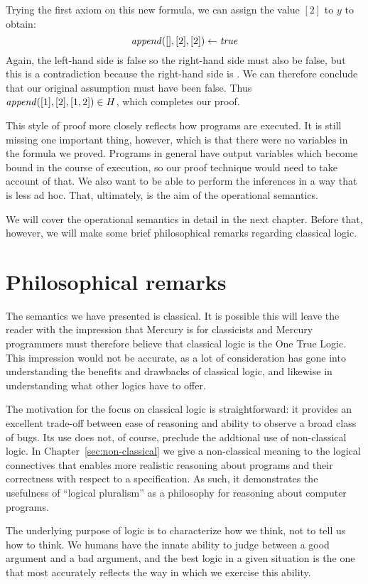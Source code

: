 Trying the first axiom on this new formula,
we can assign the value $[2]$ to $y$ to obtain:
\[
    \text{\textit{append}}([], [2], [2]) \leftarrow \text{\textit{true}}
\]
Again,
the left-hand side is false
so the right-hand side must also be false,
but this is a contradiction
because the right-hand side is .
We can therefore conclude that
our original assumption must have been false.
Thus $\text{\textit{append}}([1], [2], [1, 2]) \in H$,
which completes our proof.

This style of proof more closely reflects how programs are executed.
It is still missing one important thing, however,
which is that there were no variables in the formula we proved.
Programs in general have output variables
which become bound in the course of execution,
so our proof technique would need to take account of that.
We also want to be able to perform the inferences
in a way that is less ad hoc.
That, ultimately, is the aim of the operational semantics.

We will cover the operational semantics in detail
in the next chapter.
Before that, however,
we will make some brief philosophical remarks
regarding classical logic.


\section{Philosophical remarks}
\label{sec:philosophy}

The semantics we have presented is classical.
It is possible this will leave the reader with the impression
that Mercury is for classicists
and Mercury programmers must therefore
believe that classical logic is the One True Logic.
This impression would not be accurate,
as a lot of consideration has gone into understanding
the benefits and drawbacks of classical logic,
and likewise in understanding what other logics have to offer.

The motivation for the focus on classical logic is straightforward:
it provides an excellent trade-off between ease of reasoning
and ability to observe a broad class of bugs.
Its use does not, of course,
preclude the addtional use of non-classical logic.
In Chapter~\ref{sec:non-classical} we give
a non-classical meaning to the logical connectives
that enables more realistic reasoning about programs
and their correctness with respect to a specification.
As such, it demonstrates the usefulness of ``logical pluralism''
as a philosophy for reasoning about computer programs.

The underlying purpose of logic is to characterize how we think,
not to tell us how to think.
We humans have the innate ability to judge
between a good argument and a bad argument,
and the best logic in a given situation
is the one that most accurately reflects
the way in which we exercise this ability.
